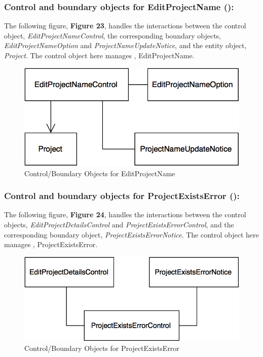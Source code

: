 \documentclass[12pt,letterpaper]{article}
\begin{document}
\subsubsection*{Control and boundary objects for EditProjectName (\editprojectname{}):}

The following figure, {\bf Figure 23}, handles the interactions between the control object, {\it EditProjectNameControl}, the corresponding boundary objects, 
{\it EditProjectNameOption} and {\it ProjectNameUpdateNotice}, and the entity object, {\it Project}. The control object here manages \editprojectname{}, EditProjectName.

\begin{figure}[H]
	\centering{}
	\includegraphics[scale=0.37]{imgs/cbod/edit-project-name.png}
	\caption{Control/Boundary Objects for EditProjectName}    
\end{figure}

\subsubsection*{Control and boundary objects for ProjectExistsError (\projectexistserror{}):}

The following figure, {\bf Figure 24}, handles the interactions between the control objects, {\it EditProjectDetailsControl} and {\it ProjectExistsErrorControl}, and the corresponding boundary object, 
{\it ProjectExistsErrorNotice}. The control object here manages \projectexistserror{}, ProjectExistsError.

\begin{figure}[H]
	\centering{}
	\includegraphics[scale=0.37]{imgs/cbod/project-exists-error.png}
	\caption{Control/Boundary Objects for ProjectExistsError}    
\end{figure}
\end{document}

